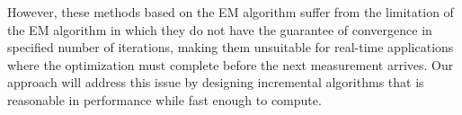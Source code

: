 
However, these methods based on the EM algorithm suffer from the limitation of
the EM algorithm in which they do not have the guarantee of convergence in
specified number of iterations, making them unsuitable for real-time
applications where the optimization must complete before the next measurement
arrives. Our approach will address this issue by designing incremental
algorithms that is reasonable in performance while fast enough to compute.

